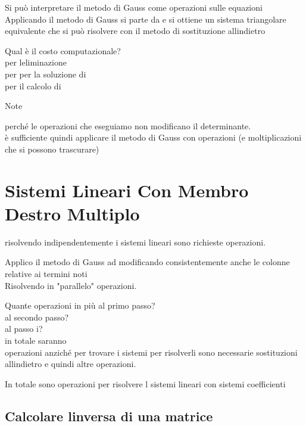 \documentclass[
]{article}
\begin{document}
Si può interpretare il metodo di Gauss come operazioni sulle equazioni\\
{}Applicando il metodo di Gauss si parte da {} e si ottiene un sistema
triangolare equivalente {} che si può risolvere con il metodo di
sostituzione all\textquotesingle indietro

Qual è il costo computazionale?\\
{} per l\textquotesingle eliminazione\\
{} per per la soluzione di {}\\
{} per il calcolo di {}

Note

{} perché le operazioni che eseguiamo non modificano il determinante.\\
è sufficiente quindi applicare il metodo di Gauss con {} operazioni (e
{} moltiplicazioni che si possono trascurare)

\hypertarget{sistemi-lineari-con-membro-destro-multiplo}{%
\section{Sistemi Lineari Con Membro Destro
Multiplo}\label{sistemi-lineari-con-membro-destro-multiplo}}

{}risolvendo indipendentemente i sistemi lineari sono richieste {}
operazioni.

Applico il metodo di Gauss ad {} modificando consistentemente anche le
colonne relative ai termini noti\\
{}{}Risolvendo in "parallelo" {} operazioni.

Quante operazioni in più al primo passo? {}\\
al secondo passo? {}\\
al passo i? {}\\
in totale saranno {}\\
{}{} operazioni anziché {} per trovare i sistemi {} per risolverli sono
necessarie {} sostituzioni all\textquotesingle indietro e quindi altre
{} operazioni.

In totale sono {} operazioni per risolvere l sistemi lineari con sistemi
coefficienti

\hypertarget{calcolare-linversa-di-una-matrice}{%
\subsection{Calcolare l\textquotesingle inversa di una
matrice}\label{calcolare-linversa-di-una-matrice}}
\end{document}
